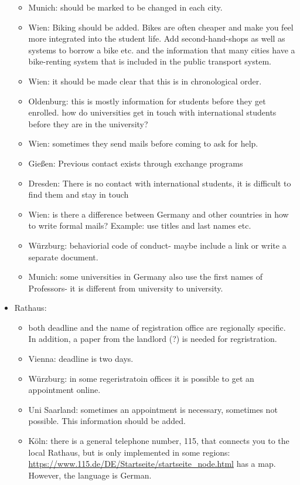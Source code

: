 \begin{itemize}
\begin{itemize}
            \item Munich: should be marked to be changed in each city.
            \item Wien: Biking should be added. Bikes are often cheaper and make you feel more integrated into the student life. Add second-hand-shops as well as systems to borrow a bike etc. and the information that many cities have a bike-renting system that is included in the public transport system.
            \item Wien: it should be made clear that this is in chronological order.
            \item Oldenburg: this is mostly information for students before they get enrolled. how do universities get in touch with international students before they are in the university?
            \item Wien: sometimes they send mails before coming to ask for help.
            \item Gießen: Previous contact exists through exchange programs
            \item Dresden: There is no contact with international students, it is difficult to find them and stay in touch
            \item Wien: is there a difference between Germany and other countries in how to write formal mails? Example: use titles and last names etc.
            \item Würzburg: behaviorial code of conduct- maybe include a link or write a separate document.
            \item Munich: some universities in Germany also use the first names of Professors- it is different from university to university.
          \end{itemize}

        \item Rathaus:
          \begin{itemize}
            \item both deadline and the name of registration office are regionally specific. In addition, a paper from the landlord (?) is needed for regristration.
            \item Vienna: deadline is two days.
            \item Würzburg: in some regeristratoin offices it is possible to get an appointment online.
            \item Uni Saarland: sometimes an appointment is necessary, sometimes not possible. This information should be added.
            \item Köln: there is a general telephone number, 115, that connects you to the local Rathaus, but is only implemented in some regions: \url{https://www.115.de/DE/Startseite/startseite_node.html} has a map. However, the language is German.
          \end{itemize}


\end{itemize}
